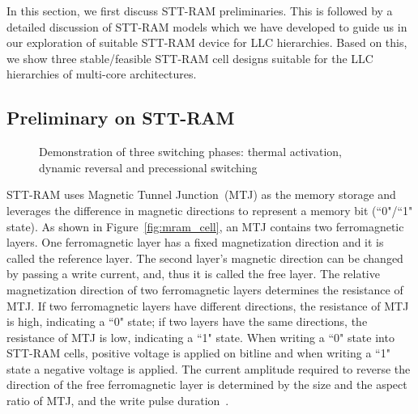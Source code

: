 In this section, we first discuss STT-RAM preliminaries. This is followed by a detailed discussion of
STT-RAM models which we have developed to guide us in our exploration of suitable STT-RAM device for
LLC hierarchies. Based on this, we show three stable/feasible STT-RAM cell designs
suitable for the LLC hierarchies of multi-core architectures.

\subsection{Preliminary on STT-RAM}


\begin{figure*} [t]
\centering
\begin{minipage}{0.575\textwidth}
\centering
 \caption{\label{fig:mram_cell} (a) Structural view of an STT-RAM Cache Cell
 (b) Anti Space Parallel High Resistance, Indicating ``0" state (c) Parallel Low Resistance, Indicating ``1" state}
\end{minipage}
\hfill
\begin{minipage}{0.375\textwidth}
\centering
 \caption{\label{fig:IcWt} Demonstration of three switching phases:
 thermal activation, dynamic reversal and precessional switching }
\end{minipage}
\end{figure*}

STT-RAM uses Magnetic Tunnel Junction~(MTJ) as the memory storage and leverages the difference in
magnetic directions to represent a memory bit (``0"/``1" state). As shown in
Figure~\ref{fig:mram_cell}, an MTJ contains two ferromagnetic layers. One ferromagnetic layer has a
fixed magnetization direction and it is called the reference layer. The second layer's magnetic
direction can be changed by passing a write current, and, thus it is called the free layer. The
relative magnetization direction of two ferromagnetic layers determines the resistance of MTJ.  If
two ferromagnetic layers have different directions, the resistance of MTJ is high, indicating a ``0"
state; if two layers have the same directions, the resistance of MTJ is low, indicating a ``1"
state. When writing a ``0" state into STT-RAM cells, positive voltage is applied on bitline and when
writing a ``1" state a negative voltage is applied. The current amplitude required to reverse the
direction of the free ferromagnetic layer is determined by the size and the aspect ratio of MTJ, and
the write pulse duration~\cite{STTRAM:JAP07, STTRAM:Qualcomm09}.

